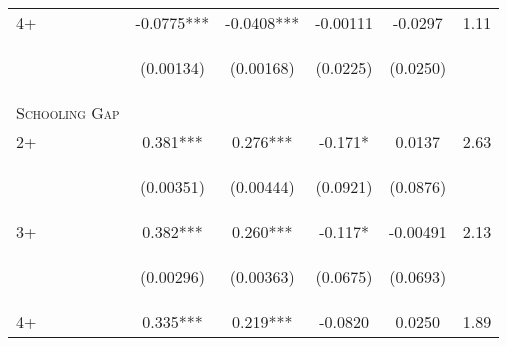 \documentclass{article}[11pt,subeqn]
\begin{document}
\begin{spacing}{1.25}
\begin{table}[!htbp]
\begin{center}
\begin{tabular}{lccccc}
4+ & -0.0775*** &	-0.0408*** & -0.00111 &	-0.0297 &  1.11 \\
\vspace{4pt} & \begin{footnotesize}(0.00134)\end{footnotesize} & \begin{footnotesize}(0.00168)\end{footnotesize} & \begin{footnotesize}(0.0225)\end{footnotesize} & \begin{footnotesize}(0.0250)\end{footnotesize} & \begin{footnotesize}\end{footnotesize} \\
\midrule
\textsc{Schooling Gap} & & & & & \\
2+ & 0.381*** & 0.276*** &	-0.171* & 0.0137 & 2.63\\
\vspace{4pt} & \begin{footnotesize}(0.00351)\end{footnotesize} & \begin{footnotesize}(0.00444)\end{footnotesize} & \begin{footnotesize}(0.0921)\end{footnotesize} & \begin{footnotesize}(0.0876)\end{footnotesize} & \begin{footnotesize}\end{footnotesize} \\
3+ & 0.382*** & 0.260*** & -0.117* & -0.00491 & 2.13\\
\vspace{4pt} & \begin{footnotesize}(0.00296)\end{footnotesize} & \begin{footnotesize}(0.00363)\end{footnotesize} & \begin{footnotesize}(0.0675)\end{footnotesize} & \begin{footnotesize}(0.0693)\end{footnotesize} & \begin{footnotesize}\end{footnotesize} \\
4+ & 0.335*** & 0.219*** & -0.0820 & 0.0250 & 1.89\\

\end{tabular}
\end{center}
\end{table}
\end{spacing}
\end{document}
